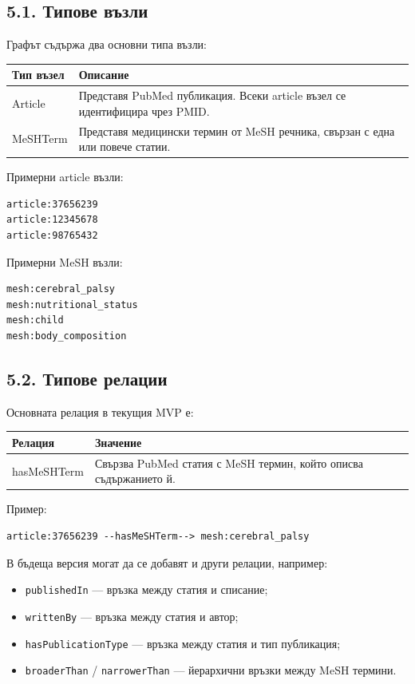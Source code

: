 \documentclass[12pt,a4paper]{article}
\providecommand{\tightlist}{\setlength{\itemsep}{0pt}\setlength{\parskip}{0pt}}
\begin{document}
\subsection{5.1. Типове възли}

Графът съдържа два основни типа възли:

\begin{longtable}{p{}p{}}
\toprule
\textbf{Тип възел} & \textbf{Описание} \\
\midrule
Article & Представя PubMed публикация. Всеки article възел се идентифицира чрез PMID. \\
MeSHTerm & Представя медицински термин от MeSH речника, свързан с една или повече статии. \\
\bottomrule
\end{longtable}

Примерни article възли:

\begin{verbatim}
article:37656239
article:12345678
article:98765432
\end{verbatim}

Примерни MeSH възли:

\begin{verbatim}
mesh:cerebral_palsy
mesh:nutritional_status
mesh:child
mesh:body_composition
\end{verbatim}

\subsection{5.2. Типове релации}

Основната релация в текущия MVP е:

\begin{longtable}{p{}p{}}
\toprule
\textbf{Релация} & \textbf{Значение} \\
\midrule
hasMeSHTerm & Свързва PubMed статия с MeSH термин, който описва съдържанието й. \\
\bottomrule
\end{longtable}

Пример:

\begin{verbatim}
article:37656239 --hasMeSHTerm--> mesh:cerebral_palsy
\end{verbatim}

В бъдеща версия могат да се добавят и други релации, например:

\begin{itemize}
\tightlist
\item
  \texttt{publishedIn} --- връзка между статия и списание;
\item
  \texttt{writtenBy} --- връзка между статия и автор;
\item
  \texttt{hasPublicationType} --- връзка между статия и тип публикация;
\item
  \texttt{broaderThan} / \texttt{narrowerThan} --- йерархични връзки между MeSH термини.
\end{itemize}
\end{document}
